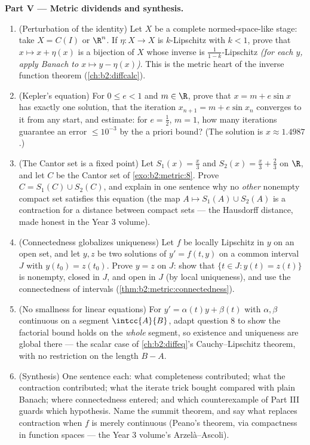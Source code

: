 \begin{problem}
\medskip
\noindent\textbf{Part V --- Metric dividends and synthesis.}
\begin{enumerate}[resume]
  \item (Perturbation of the identity) Let $X$ be a complete
        normed-space-like stage: take $X = C(I)$ or $\R^n$. If
        $\eta \colon X \to X$ is $k$-Lipschitz with $k < 1$,
        prove that $x \mapsto x + \eta(x)$ is a bijection of $X$
        whose inverse is $\frac1{1-k}$-Lipschitz \emph{(for each
        $y$, apply Banach to $x \mapsto y - \eta(x)$)}. This is
        the metric heart of the inverse function theorem
        (\cref{ch:b2:diffcalc}).
  \item (Kepler's equation) For $0 \leq e < 1$ and $m \in \R$,
        prove that $x = m + e\sin x$ has exactly one solution,
        that the iteration $x_{n+1} = m + e\sin x_n$ converges
        to it from any start, and estimate: for $e = \frac12$,
        $m = 1$, how many iterations guarantee an error $\leq
        10^{-3}$ by the a priori bound? (The solution is $x
        \approx 1.4987$.)
  \item (The Cantor set is a fixed point) Let $S_1(x) = \frac
        x3$ and $S_2(x) = \frac x3 + \frac23$ on $\R$, and let
        $C$ be the Cantor set of \cref{exo:b2:metric:8}. Prove
        $C = S_1(C) \cup S_2(C)$, and explain in one sentence
        why no \emph{other} nonempty compact set satisfies this
        equation (the map $A \mapsto S_1(A) \cup S_2(A)$ is a
        contraction for a distance between compact sets --- the
        Hausdorff distance, made honest in the Year 3 volume).
  \item (Connectedness globalizes uniqueness) Let $f$ be locally
        Lipschitz in $y$ on an open set, and let $y, z$ be two
        solutions of $y' = f(t, y)$ on a common interval $J$
        with $y(t_0) = z(t_0)$. Prove $y = z$ on $J$: show that
        $\{t \in J : y(t) = z(t)\}$ is nonempty, closed in $J$,
        and open in $J$ (by local uniqueness), and use the
        connectedness of intervals
        (\cref{thm:b2:metric:connectedness}).
  \item (No smallness for linear equations) For $y' =
        \alpha(t)y + \beta(t)$ with $\alpha, \beta$ continuous
        on a segment $\intcc{A}{B}$, adapt question 8 to show
        the factorial bound holds on the \emph{whole} segment,
        so existence and uniqueness are global there --- the
        scalar case of \cref{ch:b2:diffeq}'s Cauchy--Lipschitz
        theorem, with no restriction on the length $B - A$.
  \item (Synthesis) One sentence each: what completeness
        contributed; what the contraction contributed; what the
        iterate trick bought compared with plain Banach; where
        connectedness entered; and which counterexample of Part
        III guards which hypothesis. Name the summit theorem,
        and say what replaces contraction when $f$ is merely
        continuous (Peano's theorem, via compactness in function
        spaces --- the Year 3 volume's Arzel\`a--Ascoli).
\end{enumerate}
\end{problem}

